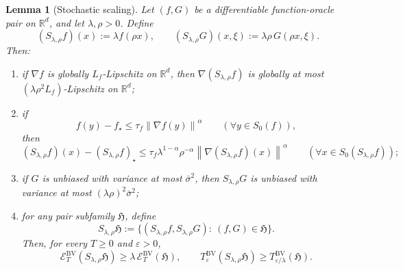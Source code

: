 \documentclass[11pt]{article}
\newtheorem{lemma}[theorem]{Lemma}
\newcommand{\R}{\mathbb{R}}
\newcommand{\norm}[1]{\left\lVert #1\right\rVert}
\begin{document}
\begin{lemma}[Stochastic scaling]
\label{lem:stochastic-scaling}
Let $(f,G)$ be a differentiable function-oracle pair on $\R^d$, and let $\lambda,\rho>0$.
Define
\[
(S_{\lambda,\rho}f)(x):=\lambda f(\rho x),
\qquad
(S_{\lambda,\rho}G)(x,\xi):=\lambda \rho\, G(\rho x,\xi).
\]
Then:
\begin{enumerate}[label=\arabic*.,leftmargin=1.5em]
    \item if $\nabla f$ is globally $L_f$-Lipschitz on $\R^d$, then $\nabla (S_{\lambda,\rho}f)$ is globally at most $(\lambda \rho^2 L_f)$-Lipschitz on $\R^d$;
    \item if
    \[
    f(y)-f_\star\le \tau_f\norm{\nabla f(y)}^\alpha
    \qquad
    (\forall y\in S_0(f)),
    \]
    then
    \[
    (S_{\lambda,\rho}f)(x)-(S_{\lambda,\rho}f)_\star
    \le
    \tau_f \lambda^{1-\alpha}\rho^{-\alpha}\norm{\nabla (S_{\lambda,\rho}f)(x)}^\alpha
    \qquad
    (\forall x\in S_0(S_{\lambda,\rho}f));
    \]
    \item if $G$ is unbiased with variance at most $\bar \sigma^2$, then $S_{\lambda,\rho}G$ is unbiased with variance at most $(\lambda \rho)^2\bar \sigma^2$;
    \item for any pair subfamily \(\mathfrak H\), define
    \[
    S_{\lambda,\rho}\mathfrak H
    :=
    \{(S_{\lambda,\rho}f,S_{\lambda,\rho}G):\ (f,G)\in\mathfrak H\}.
    \]
    Then, for every \(T\ge0\) and \(\varepsilon>0\),
    \[
    \mathcal E_T^{\mathrm{BV}}(S_{\lambda,\rho}\mathfrak H)
    \ge
    \lambda\,\mathcal E_T^{\mathrm{BV}}(\mathfrak H),
    \qquad
    T_\varepsilon^{\mathrm{BV}}(S_{\lambda,\rho}\mathfrak H)
    \ge
    T_{\varepsilon/\lambda}^{\mathrm{BV}}(\mathfrak H).
    \]
\end{enumerate}
\end{lemma}
\end{document}
